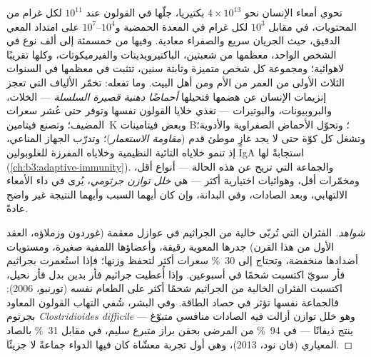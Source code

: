 \begin{definition}\label{def:b3:microbiomes:gut}
تحوي أمعاء الإنسان نحو $4\times 10^{13}$ بكتيريا، جلّها في
القولون عند $10^{11}$ لكل غرام من المحتويات، في مقابل
$10^{3}$ لكل غرام في المعدة الحمضية و$10^{4}$--$10^{7}$ على
امتداد المعي الدقيق، حيث الجريان سريع والصفراء معادية.
وفيها من خمسمئة إلى ألف نوع في الشخص الواحد، معظمها من
شعبتين، الباكتيرويديتات والفيرميكوتات، وكلها تقريبًا
لاهوائية؛ ومجموعة كل شخص متميزة وثابتة سنين، تتثبت في
معظمها في السنوات الثلاث الأولى من العمر من الأم ومن أهل
البيت. وما تفعله: تخمّر الألياف التي تعجز إنزيمات الإنسان
عن هضمها فتحيلها \emph{أحماضًا دهنية قصيرة السلسلة} ---
الخلات، والبروبيونات، والبوتيرات --- تغذي خلايا القولون
نفسها وتوفر حتى عُشر سعرات المضيف؛ وتصنع فيتامين~K وبعض
فيتامينات B؛ وتحوّل الأحماض الصفراوية والأدوية؛ وتشغل كل
كوّة حتى لا يجد غازٍ موطئ قدم (\emph{مقاومة الاستعمار})؛
وتدرّب الجهاز المناعي، إذ تنمو خلاياه التائية النظيمية
وخلاياه المفرزة للغلوبولين IgA استجابةً لها
(\cref{ch:b3:adaptive-immunity}). والجماعة التي تزيح عن هذه
الحالة --- أنواع أقل، ومخمّرات أقل، وهوائيات اختيارية أكثر
--- هي \emph{خلل توازن جرثومي}، يُرى في داء الأمعاء
الالتهابي، وبعد الصادات، وفي البدانة، وإن كان أيهما السبب
وأيهما النتيجة غير واضح عادةً.
\end{definition}

\begin{proof}[شواهد]
الفئران التي تُربّى خالية من الجراثيم في عوازل معقمة
(غوردون وزملاؤه، العقد الأول من هذا القرن) جدرها المعوية
رقيقة، وأعضاؤها اللمفية صغيرة، ومستويات أضدادها منخفضة،
وتحتاج إلى \qty{30}{\%} سعرات أكثر لتحفظ وزنها؛ فإذا
استُعمرت بجراثيم فأر سويّ اكتسبت شحمًا في أسبوعين. وإذا
أُعطيت جراثيم فأر بدين بدل فأر نحيل، اكتسبت الفئران
الخالية من الجراثيم شحمًا أكثر على الطعام نفسه (تورنبو،
2006): فالجماعة نفسها تؤثر في حصاد الطاقة. وفي البشر، شُفي
التهاب القولون المعاود بجرثوم \emph{Clostridioides
difficile} --- وهو خلل توازن أزالت فيه الصادات منافسي
متبوّغ ينتج ذيفانًا --- في \qty{94}{\%} من المرضى بحقن براز
متبرع سليم، في مقابل \qty{31}{\%} بالصاد المعياري (فان نود،
2013)، وهي أول تجربة معشّاة كان فيها الدواء جماعةً لا
جزيئًا.
\end{proof}

